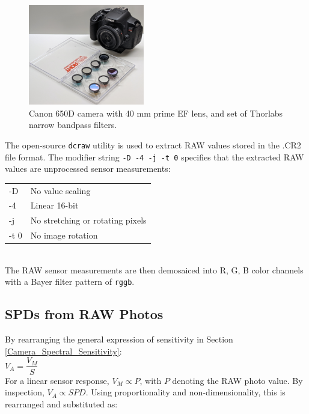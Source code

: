 \documentclass[twocolumn,10pt]{asme2ej}
\newcommand{\id}{\hspace{6 mm}}
\begin{document}
\begin{figure}
\centering
\includegraphics[width=0.45\textwidth]{IMG_20210712_212507_GIMP.jpg}
\caption{Canon 650D camera with 40 mm prime EF lens, and set of Thorlabs narrow bandpass filters.}
\label{canon}
\end{figure}

\id The open-source \texttt{dcraw} utility is used to extract RAW values stored in the .CR2 file format. \cite{dcraw} The modifier string \texttt{-D -4 -j -t 0} specifies that the extracted RAW values are unprocessed sensor measurements:\\

\begin{tabular}{l | l}
-D & No value scaling \\
-4 & Linear 16-bit \\
-j & No stretching or rotating pixels \\
-t 0 & No image rotation \\
\end{tabular} \\

The RAW sensor measurements are then demosaiced into R, G, B color channels with a Bayer filter pattern of \texttt{rggb}.

\subsection{SPDs from RAW Photos}

 By rearranging the general expression of sensitivity in Section \ref{Camera_Spectral_Sensitivity}: \\

 $V_A = \dfrac{V_M}{S}$ \\

For a linear sensor response, $V_M \propto P$, with $P$ denoting the RAW photo value. By inspection, $V_A \propto SPD$. Using proportionality and non-dimensionality, this is rearranged and substituted as: \\
\end{document}
